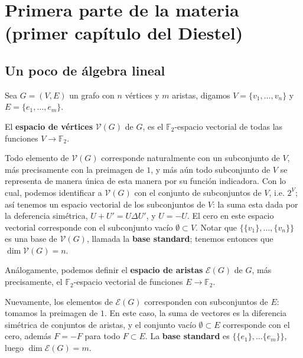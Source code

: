 \documentclass[../main.tex]{subfiles}
\begin{document}
\appendix

\chapter{Primera parte de la materia (primer capítulo del Diestel)}

\section[]{Un poco de álgebra lineal}

Sea $G = (V,E)$ un grafo con $n$ vértices y $m$ aristas, digamos $V = \{v_1,\ldots,v_n\}$ y $E = \{e_1,\ldots,e_m\}$.

\begin{definition}
El \textbf{espacio de vértices} $\mathcal{V} (G)$ de $G$, es el $\mathbb{F}_2$-espacio vectorial de todas las funciones $V \rightarrow \mathbb{F}_2$.
\end{definition}
Todo elemento de $\mathcal{V} (G)$ corresponde naturalmente con un subconjunto de $V$, más precisamente con la preimagen de $1$, y más aún todo subconjunto de $V$ se representa de manera única de esta manera por su función indicadora. Con lo cual, podemos identificar a $\mathcal{V} (G)$ con el conjunto de subconjuntos de $V$, i.e. $2^V$; así tenemos un espacio vectorial de los subconjuntos de $V$: la suma esta dada por la deferencia simétrica, $U + U' = U \Delta U'$, y $U = -U$. El cero en este espacio vectorial corresponde con el subconjunto vacío $\emptyset \subset V$. Notar que $\{ \{ v_1 \}, \ldots, \{ v_n\} \}$ es una base de $\mathcal{V} (G)$, llamada la \textbf{base standard}; tenemos entonces que $\dim \mathcal{V} (G) = n$.


\begin{definition}
Análogamente, podemos definir el \textbf{espacio de aristas} $\mathcal{E} (G)$ de $G$, más precisamente, el $\mathbb{F}_2$-espacio vectorial de funciones $E \rightarrow \mathbb{F}_2$.
\end{definition}
Nuevamente, los elementos de $\mathcal{E} (G)$ corresponden con subconjuntos de $E$: tomamos la preimagen de $1$. En este caso, la suma de vectores es la diferencia simétrica de conjuntos de aristas, y el conjunto vacío $\emptyset \subset E$ corresponde con el cero, además $F = -F$ para todo $F \subset E$. La \textbf{base standard} es $\{ \{e_1\},\ldots \{e_m\} \}$, luego $\dim \mathcal{E} (G) = m$.
\end{document}
